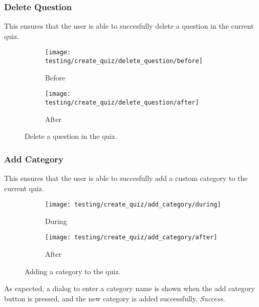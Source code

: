 \subsubsection{Delete Question} %
\label{ssub:delete_question}
This ensures that the user is able to succesfully delete a question in the current quiz.
\begin{figure}[!htbp]
\centering
\begin{subfigure}{0.5\textwidth}
  \centering
  \texttt{[image: testing/create\_quiz/delete\_question/before]}
  \caption{Before}
  \label{fig:sub1}
\end{subfigure}%
\begin{subfigure}{0.5\textwidth}
  \centering
  \texttt{[image: testing/create\_quiz/delete\_question/after]}
  \caption{After}
  \label{fig:sub2}
\end{subfigure}
\caption{Delete a question in the quiz.}
\label{fig:test}
\end{figure}


\subsubsection{Add Category} %
\label{ssub:add_category}
This ensures that the user is able to succesfully add a custom category to the current quiz.
\begin{figure}[!htbp]
\centering
\begin{subfigure}{0.5\textwidth}
  \centering
  \texttt{[image: testing/create\_quiz/add\_category/during]}
  \caption{During}
  \label{fig:sub1}
\end{subfigure}%
\begin{subfigure}{0.5\textwidth}
  \centering
  \texttt{[image: testing/create\_quiz/add\_category/after]}
  \caption{After}
  \label{fig:sub2}
\end{subfigure}
\caption{Adding a category to the quiz.}
\label{fig:test}
\end{figure}
As expected, a dialog to enter a category name is shown when the add category button is pressed, and the new category is added successfully. \textit{Success.}


